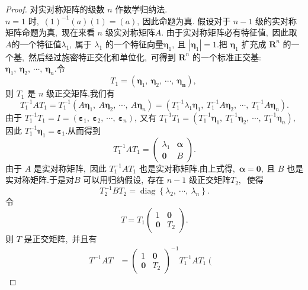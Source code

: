 \begin{proof}
	对实对称矩阵的级数  $n$  作数学归纳法.\\
	$n=1 $ 时,\ $ (1)^{-1}(a)(1)=(a) ,\  $因此命题为真.
	假设对于 $ n-1 $ 级的实对称矩阵命题为真,\  现在来看  $n $ 级实对称矩阵$A.$
	由于实对称矩阵必有特征值,\  因此取  $A  $的一个特征值$  \lambda_{1} ,\  $属于  $\lambda_{1}$  的一个特征向量$  \boldsymbol{\eta}_{1} ,\  $且 $ \left|\boldsymbol{\eta}_{1}\right|=1  $.把 $ \boldsymbol{\eta}_{1}$  扩充成  $\mathbf{R}^{n} $ 的一个基,\  然后经过施密特正交化和单位化,\  可得到 $ \mathbf{R}^{n} $ 的一个标准正交基:  $\boldsymbol{\eta}_{1},\  \boldsymbol{\eta}_{2},\  \cdots,\  \boldsymbol{\eta}_{n} . $令
	$$T_{1}=\left(\boldsymbol{\eta}_{1},\  \boldsymbol{\eta}_{2},\  \cdots,\  \boldsymbol{\eta}_{\boldsymbol{n}}\right),\ $$
	则  $T_{1}$  是 $ n$  级正交矩阵.我们有
	$$T_{1}^{-1} A T_{1}=T_{1}^{-1}\left(A \boldsymbol{\eta}_{1},\  A \boldsymbol{\eta}_{2},\  \cdots,\  A \boldsymbol{\eta}_{n}\right)=\left(T_{1}^{-1} \lambda_{1} \boldsymbol{\eta}_{1},\  T_{1}^{-1} A \boldsymbol{\eta}_{2},\  \cdots,\  T_{1}^{-1} A \boldsymbol{\eta}_{n}\right).$$
	由于 $ T_{1}^{-1} T_{1}=I=\left(\boldsymbol{\varepsilon}_{1},\  \boldsymbol{\varepsilon}_{2},\  \cdots,\  \boldsymbol{\varepsilon}_{n}\right) ,\  $又有  $T_{1}^{-1} T_{1}=\left(T_{1}^{-1} \boldsymbol{\eta}_{1},\  T_{1}^{-1} \boldsymbol{\eta}_{2},\  \cdots,\  T_{1}^{-1} \boldsymbol{\eta}_{n}\right) ,\ $
	因此 $ T_{1}^{-1} \boldsymbol{\eta}_{1}=\boldsymbol{\varepsilon}_{1} . $从而得到
	$$T_{1}^{-1} A T_{1}=\left(\begin{array}{ll}
		\lambda_{1} & \boldsymbol{\alpha} \\
		\mathbf{0} & B
	\end{array}\right) .$$
	由于  $A$  是实对称矩阵,\  因此 $ T_{1}^{-1} A T_{1}$  也是实对称矩阵.由上式得,\  $ \boldsymbol{\alpha}=\mathbf{0} ,\  $且  $B $ 也是 实对称矩阵.于是对$  B $ 可以用归纳假设,\ 存在 $ n-1 $ 级正交矩阵$  T_{2} ,\ $ 使得
	$$T_{2}^{-1} B T_{2}=\operatorname{diag}\left\{\lambda_{2},\  \cdots,\  \lambda_{n}\right\} .$$
	令
	$$T=T_{1}\left(\begin{array}{rr}
		1 & \mathbf{0} \\
		\mathbf{0} & T_{2}
	\end{array}\right) .$$
	则 $ T$  是正交矩阵,\  并且有
	$$\begin{aligned}
		T^{-1} A T & =\left(\begin{array}{cc}
			1 & \mathbf{0} \\
			\mathbf{0} & T_{2}
		\end{array}\right)^{-1} T_{1}^{-1} A T_{1}\left(\begin{array}{cc}

\end{array}
\end{aligned}$$
\end{proof}
